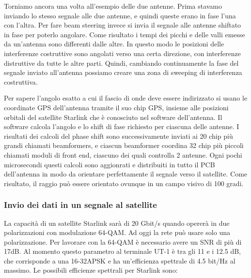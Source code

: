 Torniamo ancora una volta all'esempio delle due antenne.
Prima stavamo inviando lo stesso segnale alle due antenne, e quindi queste erano in fase l'una con l'altra.
Per fare beam steering invece si invia il segnale alle antenne shiftato in fase per poterlo angolare.
Come risultato i tempi dei picchi e delle valli emesse da un'antenna sono differenti dalle altre.
In questo modo le posizioni delle interferenze costruttive sono angolati verso una certa direzione, con interferenze distruttive da tutte le altre parti.
Quindi, cambiando continuamente la fase del segnale inviato all'antenna possiamo creare una zona di sweeping di interferenza costruttiva.

Per sapere l'angolo esatto a cui il fascio di onde deve essere indirizzato si usano le coordinate GPS dell'antenna tramite il suo chip GPS, insieme alle posizioni orbitali del satellite Starlink che è conosciuto nel software dell'antenna.
Il software calcola l'angolo e lo shift di fase richiesto per ciascuna delle antenne.
I risultati dei calcoli del phase shift sono successivamente inviati ai 20 chip più grandi chiamati beamformers, e ciascun beamformer coordina 32 chip più piccoli chiamati moduli di front end, ciascuno dei quali controlla 2 antenne.
Ogni pochi microsecondi questi calcoli sono aggionrati e distribuiti in tutto il PCB dell'antenna in modo da orientare perfettamente il segnale verso il satellite.
Come risultato, il raggio può essere orientato ovunque in un campo visivo di 100 gradi.\cite{branch_education_how_2022}


\subsubsection{Invio dei dati in un segnale al satellite}
La capacità di un satellite Starlink sarà di 20 Gbit/s quando opererà in due polarizzazioni con modulazione 64-\ac{QAM}.
Ad oggi la rete può usare solo una polarizzazione.
Per lavorare con la 64-\ac{QAM} è necessario avere un \ac{SNR} di più di 17dB.
Al momento questo parametro al terminale UT-1 è tra gli 11 e i 12.5 dB, che corrisponde a una 16-32\ac{APSK} e ha un'efficienza spettrale di 4.5 bit/Hz al massimo.
Le possibili efficienze spettrali per Starlink sono:

